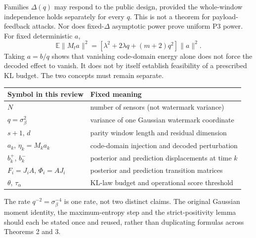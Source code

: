 \documentclass[11pt,a4paper]{article}
\newcommand{\E}{\mathbb E}
\begin{document}
Families $\Delta(q)$ may respond to the public design, provided the
whole-window independence holds separately for every $q$. This is not a
theorem for payload-feedback attacks. Nor does fixed-$\Delta$ asymptotic
power prove uniform P3 power. For fixed deterministic $a$,
\begin{equation}
 \E\|M_ta\|^2=
 [\lambda^2+2\lambda q+(m+2)q^2]\|a\|^2.\label{rev:decodedenergy}
\end{equation}
Taking $a=b/q$ shows that vanishing code-domain energy alone does not
force the decoded effect to vanish. It does not by itself establish
feasibility of a prescribed KL budget. The two concepts must remain separate.

\begin{center}
\begin{tabular}{ll}
\toprule
Symbol in this review & Fixed meaning\\
\midrule
$N$ & number of sensors (not watermark variance)\\
$q=\sigma_\beta^2$ & variance of one Gaussian watermark coordinate\\
$s+1$, $d$ & parity window length and residual dimension\\
$a_k$, $\eta_k=M_ka_k$ & code-domain injection and decoded perturbation\\
$b_k^+$, $b_k^-$ & posterior and prediction displacements at time $k$\\
$F_i=J_iA$, $\Phi_i=AJ_i$ & posterior and prediction transition matrices\\
$\theta$, $\tau_{\alpha}$ & KL-law budget and operational score threshold\\
\bottomrule
\end{tabular}
\end{center}
The rate $q^{-2}=\sigma_\beta^{-4}$ is one rate, not two distinct claims.
The original Gaussian moment identity, the maximum-entropy step and the
strict-positivity lemma should each be stated once and reused, rather than
duplicating formulas across Theorems 2 and 3.
\end{document}
